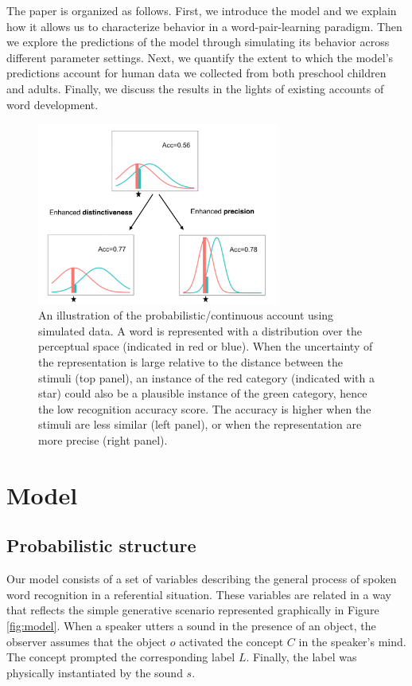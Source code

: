 \documentclass[english,,man,floatsintext]{apa6}
\theoremstyle{definition}
\theoremstyle{definition}
\theoremstyle{definition}
\theoremstyle{remark}
\begin{document}
The paper is organized as follows. First, we introduce the model and we
explain how it allows us to characterize behavior in a
word-pair-learning paradigm. Then we explore the predictions of the
model through simulating its behavior across different parameter
settings. Next, we quantify the extent to which the model's predictions
account for human data we collected from both preschool children and
adults. Finally, we discuss the results in the lights of existing
accounts of word development.

\begin{figure}

{\centering \includegraphics[width=300px]{figs/illustration} 

}

\caption{An illustration of the probabilistic/continuous account using simulated data. A word is represented with a distribution over the perceptual space (indicated in red or blue). When the uncertainty of the representation is large relative to the distance between the stimuli (top panel), an instance of the red category (indicated with a star) could also be a plausible instance of the green category, hence the low recognition accuracy score. The accuracy is higher when the stimuli are less similar (left panel), or when the representation are more precise (right panel).}\label{fig:illus}
\end{figure}

\section{Model}\label{model}

\subsection{Probabilistic structure}\label{probabilistic-structure}

Our model consists of a set of variables describing the general process
of spoken word recognition in a referential situation. These variables
are related in a way that reflects the simple generative scenario
represented graphically in Figure \ref{fig:model}. When a speaker utters
a sound in the presence of an object, the observer assumes that the
object \(o\) activated the concept \(C\) in the speaker's mind. The
concept prompted the corresponding label \(L\). Finally, the label was
physically instantiated by the sound \(s\).
\end{document}
